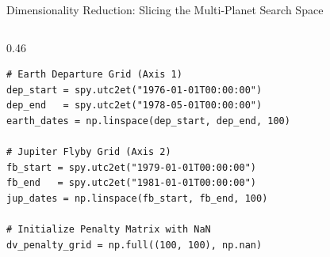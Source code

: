 \documentclass[aspectratio=169, 10pt]{beamer}
\begin{document}
\begin{frame}[fragile]{Dimensionality Reduction: Slicing the Multi-Planet Search Space}
\begin{columns}[t]
\begin{column}{0.46\textwidth}
\begin{lstlisting}[style=pythoncode]
# Earth Departure Grid (Axis 1)
dep_start = spy.utc2et("1976-01-01T00:00:00")
dep_end   = spy.utc2et("1978-05-01T00:00:00")
earth_dates = np.linspace(dep_start, dep_end, 100)

# Jupiter Flyby Grid (Axis 2)
fb_start = spy.utc2et("1979-01-01T00:00:00")
fb_end   = spy.utc2et("1981-01-01T00:00:00")
jup_dates = np.linspace(fb_start, fb_end, 100)

# Initialize Penalty Matrix with NaN
dv_penalty_grid = np.full((100, 100), np.nan)
\end{lstlisting}
        \end{column}
    \end{columns}
\end{frame}

\end{document}
